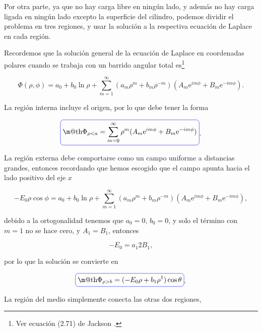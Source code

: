 \documentclass[a4paper,11pt]{article}
\makeatletter
\numberwithin{equation}{section}
\newcommand*{\boxcolor}{blue}
\renewcommand{\boxed}[1]{\textcolor{\boxcolor}{%
\tikz[baseline={([yshift=-1ex]current bounding box.center)}] \node [rectangle, minimum width=1ex,rounded corners,draw] {\normalcolor\m@th$\displaystyle#1$};}}
\newcommand{\euler}{\mathrm{e}}
\makeatother
\begin{document}
\vspace{.3cm}

Por otra parte, ya que no hay carga libre en ningún lado, y además no hay carga ligada 
en ningún lado excepto la superficie del cilindro, podemos dividir el problema en 
tres regiones, y usar la solución a la respectiva ecuación de Laplace en cada 
región.

\vspace{.3cm}

Recordemos que la solución general de la ecuación de Laplace en coordenadas polares
cuando se trabaja con un barrido angular total es\footnote{Ver ecuación (2.71) de 
Jackson \cite{jackson}.}

\begin{equation}
 \Phi(\rho,\phi) = a_0 + b_0 \ln{\rho} + \sum_{m=1}^\infty (a_m \rho^m + b_m \rho^{-m})
 (A_m \euler^{im\phi} + B_m \euler^{-im\phi}).
\end{equation}

La región interna incluye el origen, por lo que debe tener la forma 

\begin{equation}
 \boxed{\Phi_{\rho < a} = \sum_{m=0}^\infty \rho^m (A_m \euler^{im\phi} + B_m \euler^{-im\phi})}.
\end{equation}

La región externa debe comportarse como un campo uniforme a distancias grandes, entonces 
recordando que hemos escogido que el campo apunta hacia el lado positivo del eje $x$

\begin{equation}
 - E_0\rho\cos{\phi} =  a_0 + b_0 \ln{\rho} + \sum_{m=1}^\infty (a_m \rho^m + b_m \rho^{-m})
 (A_m \euler^{im\phi} + B_m \euler^{-im\phi}),
\end{equation}

debido a la ortogonalidad tenemos que $a_0 = 0$, $b_0 = 0$, y solo el término con 
$m=1$ no se hace cero, y $A_1 = B_1$, entonces 

\begin{equation}
 -E_0 = a_1 2 B_1,
\end{equation}

por lo que la solución se convierte en 

\begin{equation}
 \boxed{\Phi_{\rho>b} = (-E_0 \rho + b_1 \rho^{1})\cos{\theta}}.
\end{equation}

La región del medio simplemente conecta las otras dos regiones, 
\end{document}

